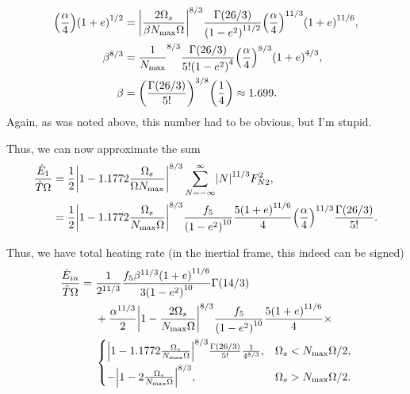 \documentclass[11pt,
        usenames, %
        dvipsnames %
    ]{article}
\DeclarePairedDelimiter\abs{\lvert}{\rvert}
\DeclarePairedDelimiter\p{\lparen}{\rparen}
\begin{document}
\begin{itemize}
\begin{align}
                    \p*{\frac{\alpha}{4}}\p*{1 + e}^{1/2}
                &= \abs*{\frac{2\Omega_s}{\beta N_{\max}\Omega}}^{8/3}
                    \frac{\Gamma(26/3)}{\p*{1 - e^2}^{11/2}}
                    \p*{\frac{\alpha}{4}}^{11/3}\p*{1 + e}^{11/6},\\
            \beta^{8/3}
                &= \frac{1}{N_{\max}}^{8/3}
                    \frac{\Gamma(26/3)}{5! \p*{1 - e^2}^{4}}
                    \p*{\frac{\alpha}{4}}^{8/3}\p*{1 + e}^{4/3},\\
            \beta
                &= \p*{\frac{\Gamma(26/3)}{5!}}^{3/8} \p*{\frac{1}{4}}
                    \approx 1.699.
        \end{align}
        Again, as was noted above, this number had to be obvious, but I'm
        stupid.

        Thus, we can now approximate the sum
        \begin{align}
            \frac{\dot{E}_1}{\hat{T}\Omega}
                &= \frac{1}{2}
                    \abs*{1 - 1.1772\frac{\Omega_s}{\Omega N_{\max}}}^{8/3}
                    \sum\limits_{N = -\infty}^\infty \abs*{N}^{11/3}F_{N2}^2,\\
                &= \frac{1}{2}
                    \abs*{1 - 1.1772\frac{\Omega_s}{N_{\max}\Omega}}^{8/3}
                    \frac{f_5}{\p*{1 - e^2}^{10}}\frac{5\p*{1 + e}^{11/6}}{4}
                    \p*{\frac{\alpha}{4}}^{11/3}
                    \frac{\Gamma(26/3)}{5!}.
        \end{align}
\end{itemize}
Thus, we have total heating rate (in the inertial frame, this indeed can be
signed)
\begin{align}
    \frac{\dot{E}_{in}}{\hat{T}\Omega} ={}&
            \frac{1}{2^{11/3}}
            \frac{f_5 \beta^{11/3}\p*{1 + e}^{11/6}}{3\p*{1 - e^2}^{10}}
            \Gamma\p*{14/3}\nonumber\\
        & + \frac{\alpha^{11/3}}{2}
                \abs*{1 - \frac{2\Omega_s}{N_{\max}\Omega}}^{8/3}
                \frac{f_5}{\p*{1 - e^2}^{10}}\frac{5\p*{1 + e}^{11/6}}{4}
                \times\nonumber\\
        &\begin{cases}
            \abs*{1 - 1.1772\frac{\Omega_s}{N_{\max}\Omega}}^{8/3}
                \frac{\Gamma(26/3)}{5!}\frac{1}{4^{8/3}},
                & \Omega_s < N_{\max}\Omega/2,\\[5pt]
            -\abs*{1 - 2\frac{\Omega_s}{N_{\max}\Omega}}^{8/3},
                & \Omega_s > N_{\max}\Omega/2.
        \end{cases}\label{eq:total_heating}
\end{align}
\end{document}
